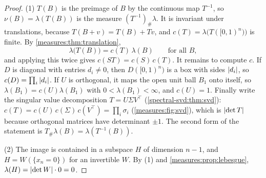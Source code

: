 \begin{notechapter}
\begin{proof}
(1) $T(B)$ is the preimage of $B$ by the continuous map $T^{-1}$, so
$\nu(B) = \lambda(T(B))$ is the measure $(T^{-1})_\#\lambda$. It is
invariant under translations, because $T(B + v) = T(B) + Tv$, and
$c(T) = \lambda\bigl(T([0, 1)^n)\bigr)$ is finite. By
\cref{measures:thm:translation},
\[
  \lambda\bigl(T(B)\bigr) = c(T)\,\lambda(B) \qquad\text{for all } B ,
\]
and applying this twice gives $c(ST) = c(S)\,c(T)$. It remains to
compute $c$. If $D$ is diagonal with entries $d_i\neq0$, then
$D([0, 1)^n)$ is a box with sides $\left|d_i\right|$, so
$c(D) = \prod_i\left|d_i\right|$. If $U$ is orthogonal, it maps the open unit
ball $B_1$ onto itself, so $\lambda(B_1) = c(U)\lambda(B_1)$ with
$0 < \lambda(B_1) < \infty$, and $c(U) = 1$. Finally write the singular
value decomposition $T = U\Sigma V^\top$
(\cref{spectral-svd:thm:svd}):
$c(T) = c(U)\,c(\Sigma)\,c(V^\top) = \prod_i\sigma_i$
(\cref{measures:fig:svd}), which is
$\left|\det T\right|$ because orthogonal matrices have determinant $\pm1$. The
second form of the statement is
$T_\#\lambda(B) = \lambda(T^{-1}(B))$.

(2) The image is contained in a subspace $H$ of dimension $n - 1$, and
$H = W(\{x_n = 0\})$ for an invertible $W$. By (1) and
\cref{measures:prop:lebesgue}, $\lambda(H) = \left|\det W\right|\cdot0 = 0$.
\end{proof}


\end{notechapter}
